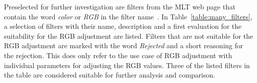 \documentclass[../MasterThesis.tex]{subfiles}
\begin{document}
Preselected for further investigation are filters from the MLT web page that contain the word \textit{color} or \textit{RGB} in the filter name~\cite{melt_filters}. In Table~\ref{table:many_filters}, a selection of filters with their name, description and a first evaluation for the suitability for the RGB adjustment are listed. Filters that are not suitable for the RGB adjustment are marked with the word \textit{Rejected} and a short reasoning for the rejection. This does only refer to the use case of RGB adjustment with individual parameters for adjusting the RGB values.
Three of the listed filters in the table are considered suitable for further analysis and comparison.

%
\end{document}
